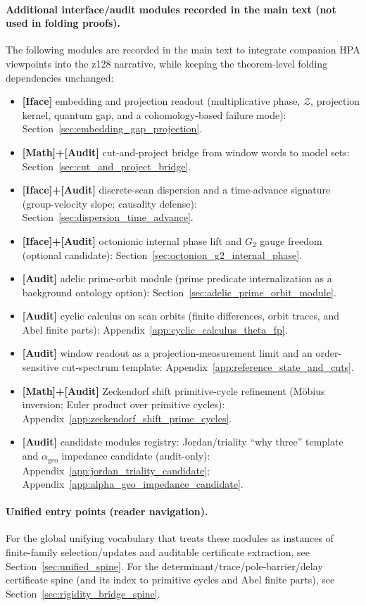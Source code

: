 \paragraph{Additional interface/audit modules recorded in the main text (not used in folding proofs).}
\AuditTag The following modules are recorded in the main text to integrate companion HPA viewpoints into the z128 narrative, while keeping the theorem-level folding dependencies unchanged:
\begin{itemize}
\item \textbf{[Iface]} embedding and projection readout (multiplicative phase, $\mathcal{Z}$, projection kernel, quantum gap, and a cohomology-based failure mode): Section~\ref{sec:embedding_gap_projection}.
\item \textbf{[Math]+[Audit]} cut-and-project bridge from window words to model sets: Section~\ref{sec:cut_and_project_bridge}.
\item \textbf{[Iface]+[Audit]} discrete-scan dispersion and a time-advance signature (group-velocity slope; causality defense): Section~\ref{sec:dispersion_time_advance}.
\item \textbf{[Iface]+[Audit]} octonionic internal phase lift and $G_2$ gauge freedom (optional candidate): Section~\ref{sec:octonion_g2_internal_phase}.
\item \textbf{[Audit]} adelic prime-orbit module (prime predicate internalization as a background ontology option): Section~\ref{sec:adelic_prime_orbit_module}.
\item \textbf{[Audit]} cyclic calculus on scan orbits (finite differences, orbit traces, and Abel finite parts): Appendix~\ref{app:cyclic_calculus_theta_fp}.
\item \textbf{[Audit]} window readout as a projection-measurement limit and an order-sensitive cut-spectrum template: Appendix~\ref{app:reference_state_and_cuts}.
\item \textbf{[Math]+[Audit]} Zeckendorf shift primitive-cycle refinement (M\"obius inversion; Euler product over primitive cycles): Appendix~\ref{app:zeckendorf_shift_prime_cycles}.
\item \textbf{[Audit]} candidate modules registry: Jordan/triality ``why three'' template and $\alpha_{\mathrm{geo}}$ impedance candidate (audit-only): Appendix~\ref{app:jordan_triality_candidate}; Appendix~\ref{app:alpha_geo_impedance_candidate}.
\end{itemize}

\paragraph{Unified entry points (reader navigation).}
\AuditTag For the global unifying vocabulary that treats these modules as instances of finite-family selection/updates and auditable certificate extraction, see Section~\ref{sec:unified_spine}.
For the determinant/trace/pole-barrier/delay certificate spine (and its index to primitive cycles and Abel finite parts), see Section~\ref{sec:rigidity_bridge_spine}.

